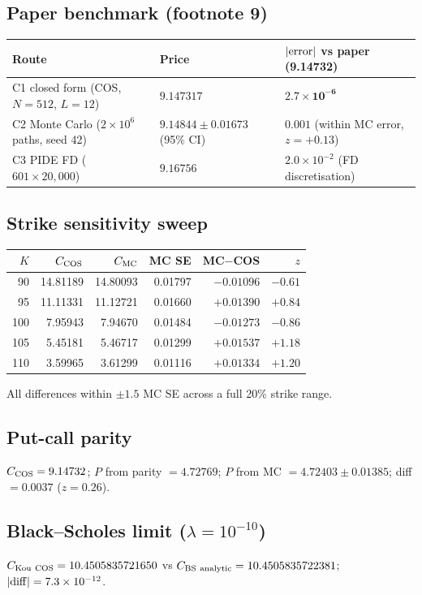 \documentclass[11pt]{article}
\begin{document}
\subsection{Paper benchmark (footnote 9)}
\begin{center}
\begin{tabular}{lll}
\toprule
Route & Price & $|{\rm error}|$ vs paper (9.14732) \\
\midrule
C1 closed form (COS, $N=512$, $L=12$) & $\mathbf{9.147317}$ & $\mathbf{2.7\times 10^{-6}}$ \\
C2 Monte Carlo ($2\times 10^6$ paths, seed 42) & $9.14844 \pm 0.01673$ (95\% CI) & $0.001$ (within MC error, $z=+0.13$) \\
C3 PIDE FD ($601 \times 20{,}000$) & $9.16756$ & $2.0\times 10^{-2}$ (FD discretisation) \\
\bottomrule
\end{tabular}
\end{center}

\subsection{Strike sensitivity sweep}
\begin{center}
\begin{tabular}{rrrrrr}
\toprule
$K$ & $C_{\rm COS}$ & $C_{\rm MC}$ & MC SE & MC$-$COS & $z$ \\
\midrule
90  & 14.81189 & 14.80093 & 0.01797 & $-0.01096$ & $-0.61$ \\
95  & 11.11331 & 11.12721 & 0.01660 & $+0.01390$ & $+0.84$ \\
100 &  7.95943 &  7.94670 & 0.01484 & $-0.01273$ & $-0.86$ \\
105 &  5.45181 &  5.46717 & 0.01299 & $+0.01537$ & $+1.18$ \\
110 &  3.59965 &  3.61299 & 0.01116 & $+0.01334$ & $+1.20$ \\
\bottomrule
\end{tabular}
\end{center}
All differences within $\pm 1.5$ MC SE across a full 20\% strike range.

\subsection{Put-call parity}
$C_{\rm COS}=9.14732$; $P$ from parity $=4.72769$; $P$ from MC $=4.72403\pm 0.01385$; diff $=0.0037$ ($z=0.26$).

\subsection{Black--Scholes limit ($\lambda = 10^{-10}$)}
$C_{\rm Kou\ COS}=10.4505835721650$ vs $C_{\rm BS\ analytic}=10.4505835722381$; $|{\rm diff}|=7.3\times 10^{-12}$.
\end{document}
